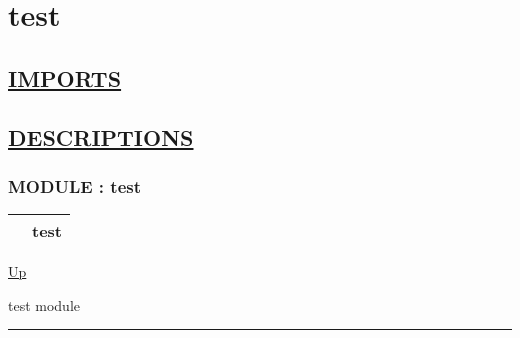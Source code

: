 \chapter*{test}
\hypertarget{ecldoc:toc:test}{}

\section*{\underline{IMPORTS}}

\section*{\underline{DESCRIPTIONS}}
\subsection*{MODULE : test}
\hypertarget{ecldoc:test}{}

{\renewcommand{\arraystretch}{1.5}
\begin{tabularx}{\textwidth}{|>{\raggedright\arraybackslash}l|X|}
\hline
\hspace{0pt} & test \\
\hline
\end{tabularx}
}

\hyperlink{ecldoc:toc:root}{Up}

\par
test module


\rule{\textwidth}{0.4pt}
